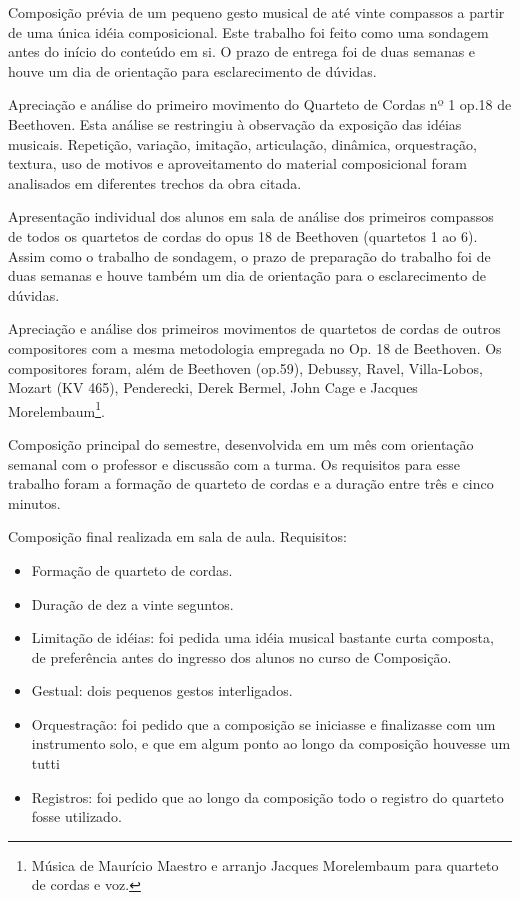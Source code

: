 \documentclass{article}
\begin{document}

Composição prévia de um pequeno gesto musical de até vinte compassos a
partir de uma única idéia composicional. Este trabalho foi feito como
uma sondagem antes do início do conteúdo em si. O prazo de entrega foi
de duas semanas e houve um dia de orientação para esclarecimento de
dúvidas.

Apreciação e análise do primeiro movimento do Quarteto de Cordas nº 1
op.18 de Beethoven. Esta análise se restringiu à observação da
exposição das idéias musicais. Repetição, variação, imitação,
articulação, dinâmica, orquestração, textura, uso de motivos e
aproveitamento do material composicional foram analisados em
diferentes trechos da obra citada.

Apresentação individual dos alunos em sala de análise dos primeiros
compassos de todos os quartetos de cordas do opus 18 de Beethoven
(quartetos 1 ao 6). Assim como o trabalho de sondagem, o prazo de
preparação do trabalho foi de duas semanas e houve também um dia de
orientação para o esclarecimento de dúvidas.

Apreciação e análise dos primeiros movimentos de quartetos de cordas
de outros compositores com a mesma metodologia empregada no Op. 18 de
Beethoven. Os compositores foram, além de Beethoven (op.59), Debussy,
Ravel, Villa-Lobos, Mozart (KV 465), Penderecki, Derek Bermel, John
Cage e Jacques Morelembaum\footnote{Música de Maurício Maestro e
  arranjo Jacques Morelembaum para quarteto de cordas e voz.}.

Composição principal do semestre, desenvolvida em um mês com
orientação semanal com o professor e discussão com a turma. Os
requisitos para esse trabalho foram a formação de quarteto de cordas e
a duração entre três e cinco minutos.

Composição final realizada em sala de aula. Requisitos:
\begin{itemize}
\item Formação de quarteto de cordas.
\item Duração de dez a vinte seguntos.
\item Limitação de idéias: foi pedida uma idéia musical bastante curta
  composta, de preferência antes do ingresso dos alunos no curso de
  Composição.
\item Gestual: dois pequenos gestos interligados.
\item Orquestração: foi pedido que a composição se iniciasse e
  finalizasse com um instrumento solo, e que em algum ponto ao longo
  da composição houvesse um tutti
\item Registros: foi pedido que ao longo da composição todo o registro
  do quarteto fosse utilizado.
\end{itemize}
\end{document}
